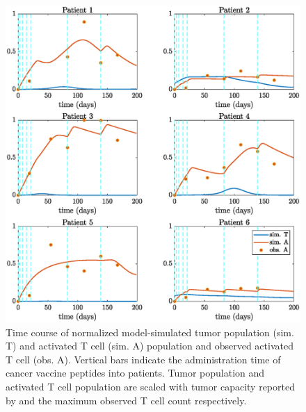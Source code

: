 \documentclass[review,authoryear]{elsarticle}
\begin{document}
\begin{figure}[!h]
\centerline{\includegraphics[width=0.7\paperwidth]{figs/pat1-6fitting}}\caption{Time course of normalized model-simulated tumor population (sim. T) and activated T cell (sim. A) population and observed activated T cell (obs. A). Vertical bars indicate the administration time of cancer vaccine peptides into patients. Tumor population and activated T cell population are scaled with tumor capacity reported by \citet{Messan2021} and the maximum observed T cell count respectively.  \label{fig:data-fitting.}}
\end{figure}
\end{document}
